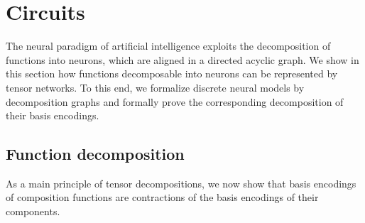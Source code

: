 \section{Circuits}\label{sec:circuits}

The neural paradigm of artificial intelligence exploits the decomposition of functions into neurons, which are aligned in a directed acyclic graph.
We show in this section how functions decomposable into neurons can be represented by tensor networks.
To this end, we formalize discrete neural models by decomposition graphs and formally prove the corresponding decomposition of their basis encodings.

\subsection{Function decomposition}

As a main principle of tensor decompositions, we now show that basis encodings of composition functions are contractions of the basis encodings of their components.

